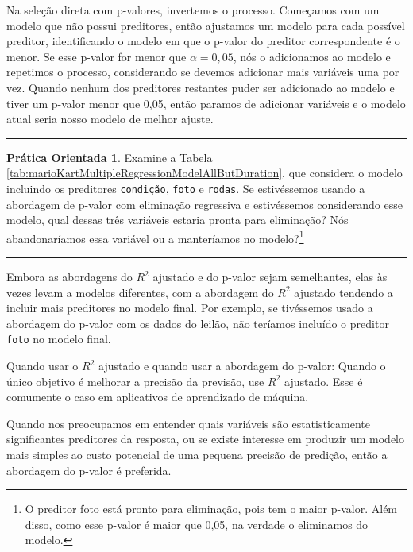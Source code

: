 \documentclass[
]{book}
\theoremstyle{definition}
\theoremstyle{definition}
\theoremstyle{definition}
\newtheorem{exercise}{Prática Orientada}[chapter]
\theoremstyle{definition}
\theoremstyle{remark}
\begin{document}
Na seleção direta com p-valores, invertemos o processo. Começamos com um modelo que não possui preditores, então ajustamos um modelo para cada possível preditor, identificando o modelo em que o p-valor do preditor correspondente é o menor. Se esse p-valor for menor que \(\alpha = 0,05\), nós o adicionamos ao modelo e repetimos o processo, considerando se devemos adicionar mais variáveis uma por vez. Quando nenhum dos preditores restantes puder ser adicionado ao modelo e tiver um p-valor menor que 0,05, então paramos de adicionar variáveis e o modelo atual seria nosso modelo de melhor ajuste.

\begin{center}\rule{0.5\linewidth}{0.5pt}\end{center}

\begin{exercise}
\protect\hypertarget{exr:unnamed-chunk-297}{}{\label{exr:unnamed-chunk-297} }Examine a Tabela \ref{tab:marioKartMultipleRegressionModelAllButDuration}, que considera o modelo incluindo os preditores \texttt{condição}, \texttt{foto} e \texttt{rodas}. Se estivéssemos usando a abordagem de p-valor com eliminação regressiva e estivéssemos considerando esse modelo, qual dessas três variáveis estaria pronta para eliminação? Nós abandonaríamos essa variável ou a manteríamos no modelo?\footnote{O preditor foto está pronto para eliminação, pois tem o maior p-valor. Além disso, como esse p-valor é maior que 0,05, na verdade o eliminamos do modelo.}
\end{exercise}

\begin{center}\rule{0.5\linewidth}{0.5pt}\end{center}

Embora as abordagens do \(R^2\) ajustado e do p-valor sejam semelhantes, elas às vezes levam a modelos diferentes, com a abordagem do \(R^2\) ajustado tendendo a incluir mais preditores no modelo final. Por exemplo, se tivéssemos usado a abordagem do p-valor com os dados do leilão, não teríamos incluído o preditor \texttt{foto} no modelo final.

Quando usar o \(R^2\) ajustado e quando usar a abordagem do p-valor: Quando o único objetivo é melhorar a precisão da previsão, use \(R^2\) ajustado. Esse é comumente o caso em aplicativos de aprendizado de máquina.

Quando nos preocupamos em entender quais variáveis são estatisticamente significantes preditores da resposta, ou se existe interesse em produzir um modelo mais simples ao custo potencial de uma pequena precisão de predição, então a abordagem do p-valor é preferida.
\end{document}
